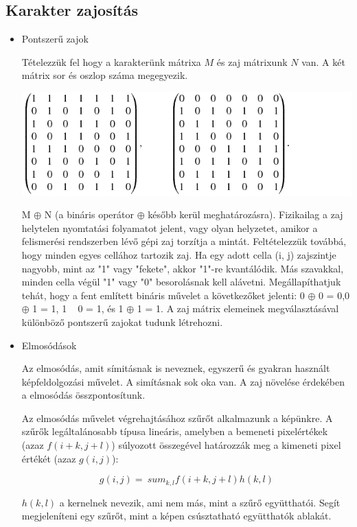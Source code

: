 \subsection{Karakter zajosítás}
\begin{itemize}
\item Pontszerű zajok

Tételezzük fel hogy a karakterünk mátrixa $M$ és zaj mátrixunk $N$ van. A két mátrix sor és oszlop száma megegyezik.

\begin{center}
\includegraphics[scale=0.6]{images/noise_matrix}
\end{center}

M $\oplus$ N (a bináris operátor $\oplus$ később kerül meghatározásra). Fizikailag a zaj helytelen nyomtatási folyamatot jelent, vagy olyan helyzetet, amikor a felismerési rendszerben lévő gépi zaj torzítja a mintát. Feltételezzük továbbá, hogy minden egyes cellához tartozik zaj.
Ha egy adott cella (i, j) zajszintje nagyobb, mint az "1" vagy "fekete", akkor "1"-re kvantálódik. Más szavakkal, minden cella végül "1" vagy "0" besorolásnak kell alávetni. Megállapíthatjuk tehát, hogy a fent említett bináris művelet a következőket jelenti: 0 $\oplus$ 0 = 0,0 $\oplus$ 1 = 1, 1 ~ 0 = 1, és 1 $\oplus$ 1 = 1.
A zaj mátrix elemeinek megválasztásával különböző pontszerű zajokat tudunk létrehozni.
\item Elmosódások

Az elmosódás, amit símitásnak is neveznek, egyszerű és gyakran használt képfeldolgozási művelet. A simításnak sok oka van. A zaj növelése érdekében a elmosódás összpontosítunk.

Az elmosódás művelet végrehajtásához szűrőt alkalmazunk a képünkre. A szűrők legáltalánosabb típusa lineáris, amelyben a bemeneti pixelértékek (azaz $f(i+k, j+l)$) súlyozott összegével határozzák meg a kimeneti pixel értékét (azaz $g(i, j)$):

\[g (i, j) = \ sum_ {k, l} f (i + k, j + l) h (k, l)\]

$h(k, l)$ a kernelnek nevezik, ami nem más, mint a szűrő együtthatói. Segít megjeleníteni egy szűrőt, mint a képen csúsztatható együtthatók ablakát.


\end{itemize}
